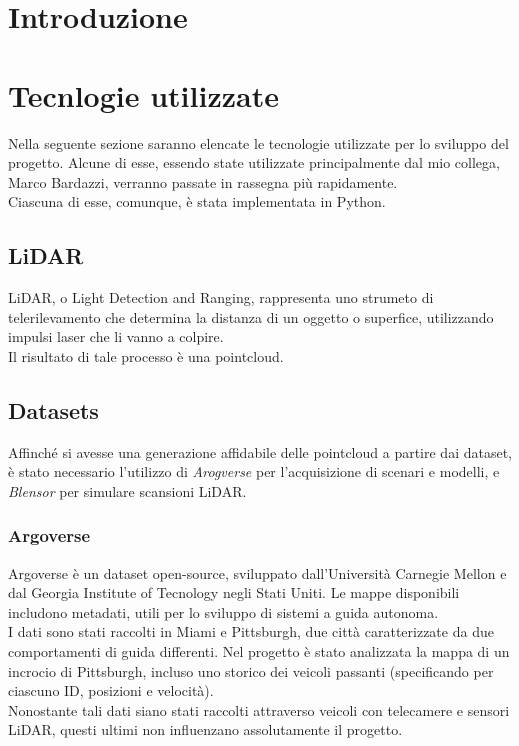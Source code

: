 \documentclass[italian]{article}
\begin{document}
\section*{Introduzione}

\section*{Tecnlogie utilizzate}
Nella seguente sezione saranno elencate le tecnologie utilizzate per lo sviluppo del progetto. Alcune di esse, essendo state utilizzate principalmente dal mio collega, Marco Bardazzi, verranno passate in rassegna più rapidamente.\\
Ciascuna di esse, comunque, è stata implementata in Python.
\subsection{LiDAR}
LiDAR, o Light Detection and Ranging, rappresenta uno strumeto di telerilevamento che determina la distanza di un oggetto o superfice, utilizzando impulsi laser che li vanno a colpire.\\
Il risultato di tale processo è una pointcloud.
\subsection{Datasets}
Affinché si avesse una generazione affidabile delle pointcloud a partire dai dataset, è stato necessario l'utilizzo di \textit{Arogverse} per l'acquisizione di scenari e modelli, e \textit{Blensor} per simulare scansioni LiDAR.\\
\subsubsection{Argoverse}
Argoverse è un dataset open-source, sviluppato dall'Università Carnegie Mellon e dal Georgia Institute of Tecnology negli Stati Uniti. Le mappe disponibili includono metadati, utili per lo sviluppo di sistemi a guida autonoma.\\
I dati sono stati raccolti in Miami e Pittsburgh, due città caratterizzate da due comportamenti di guida differenti. Nel progetto è stato analizzata la mappa di un incrocio di Pittsburgh, incluso uno storico dei veicoli passanti (specificando per ciascuno ID, posizioni e velocità).\\
Nonostante tali dati siano stati raccolti attraverso veicoli con telecamere e sensori LiDAR, questi ultimi non influenzano assolutamente il progetto.
\end{document}
